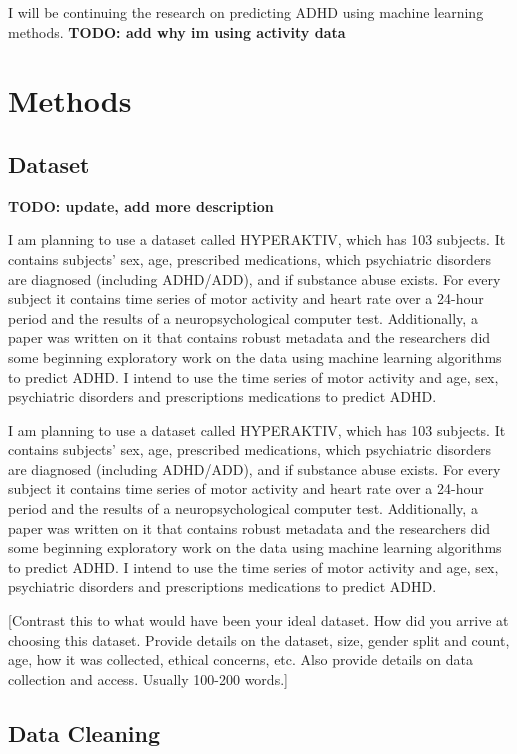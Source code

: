 \documentclass[,article,submit,moreauthors,pdftex]{mdpi}
\begin{document}
I will be continuing the research on predicting ADHD using machine
learning methods. \textbf{TODO: add why im using activity data}

\hypertarget{methods}{%
\section{Methods}\label{methods}}

\hypertarget{dataset}{%
\subsection{Dataset}\label{dataset}}

\textbf{TODO: update, add more description}

I am planning to use a dataset called HYPERAKTIV, which has 103
subjects. It contains subjects' sex, age, prescribed medications, which
psychiatric disorders are diagnosed (including ADHD/ADD), and if
substance abuse exists. For every subject it contains time series of
motor activity and heart rate over a 24-hour period and the results of a
neuropsychological computer test. Additionally, a paper was written on
it that contains robust metadata and the researchers did some beginning
exploratory work on the data using machine learning algorithms to
predict ADHD. I intend to use the time series of motor activity and age,
sex, psychiatric disorders and prescriptions medications to predict
ADHD.

I am planning to use a dataset called HYPERAKTIV, which has 103
subjects. It contains subjects' sex, age, prescribed medications, which
psychiatric disorders are diagnosed (including ADHD/ADD), and if
substance abuse exists. For every subject it contains time series of
motor activity and heart rate over a 24-hour period and the results of a
neuropsychological computer test. Additionally, a paper was written on
it that contains robust metadata and the researchers did some beginning
exploratory work on the data using machine learning algorithms to
predict ADHD. I intend to use the time series of motor activity and age,
sex, psychiatric disorders and prescriptions medications to predict
ADHD.

{[}Contrast this to what would have been your ideal dataset. How did you
arrive at choosing this dataset. Provide details on the dataset, size,
gender split and count, age, how it was collected, ethical concerns,
etc. Also provide details on data collection and access. Usually 100-200
words.{]}

\hypertarget{data-cleaning}{%
\subsection{Data Cleaning}\label{data-cleaning}}
\end{document}
